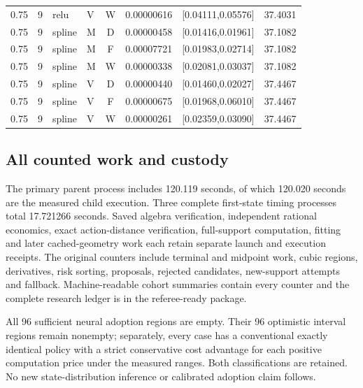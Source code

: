 \begin{longtable}{rrllcrrr}
0.75 & 9 & relu & V & W & 0.00000616 & [0.04111,0.05576] & 37.4031 \\

0.75 & 9 & spline & M & D & 0.00000458 & [0.01416,0.01961] & 37.1082 \\

0.75 & 9 & spline & M & F & 0.00007721 & [0.01983,0.02714] & 37.1082 \\

0.75 & 9 & spline & M & W & 0.00000338 & [0.02081,0.03037] & 37.1082 \\

0.75 & 9 & spline & V & D & 0.00000440 & [0.01460,0.02027] & 37.4467 \\

0.75 & 9 & spline & V & F & 0.00000675 & [0.01968,0.06010] & 37.4467 \\

0.75 & 9 & spline & V & W & 0.00000261 & [0.02359,0.03090] & 37.4467 \\

\bottomrule\end{longtable}\endgroup

\subsection{All counted work and custody}

The primary parent process includes 120.119 seconds, of which 120.020 seconds are the measured child execution. Three complete first-state timing processes total 17.721266 seconds. Saved algebra verification, independent rational economics, exact action-distance verification, full-support computation, fitting and later cached-geometry work each retain separate launch and execution receipts. The original counters include terminal and midpoint work, cubic regions, derivatives, risk sorting, proposals, rejected candidates, new-support attempts and fallback. Machine-readable cohort summaries contain every counter and the complete research ledger is in the referee-ready package.

All 96 sufficient neural adoption regions are empty. Their 96 optimistic interval regions remain nonempty; separately, every case has a conventional exactly identical policy with a strict conservative cost advantage for each positive computation price under the measured ranges. Both classifications are retained. No new state-distribution inference or calibrated adoption claim follows.
